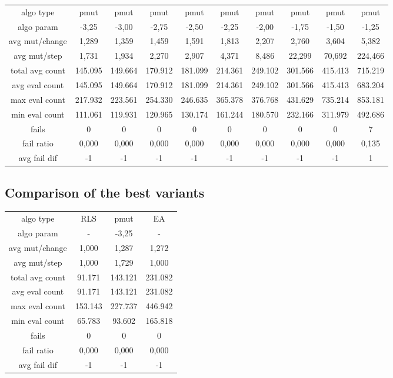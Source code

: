\begin{tabular}[h]{cccccccccc}
algo type&           pmut&    pmut&    pmut&    pmut&    pmut&    pmut&    pmut&    pmut&    pmut\\
algo param&         -3,25&   -3,00&   -2,75&   -2,50&   -2,25&   -2,00&   -1,75&   -1,50&   -1,25\\
avg mut/change&     1,289&   1,359&   1,459&   1,591&   1,813&   2,207&   2,760&   3,604&   5,382\\
avg mut/step&       1,731&   1,934&   2,270&   2,907&   4,371&   8,486&  22,299&  70,692& 224,466\\
\hline
total avg count&  145.095& 149.664& 170.912& 181.099& 214.361& 249.102& 301.566& 415.413& 715.219\\
avg eval count&   145.095& 149.664& 170.912& 181.099& 214.361& 249.102& 301.566& 415.413& 683.204\\
max eval count&   217.932& 223.561& 254.330& 246.635& 365.378& 376.768& 431.629& 735.214& 853.181\\
min eval count&   111.061& 119.931& 120.965& 130.174& 161.244& 180.570& 232.166& 311.979& 492.686\\
\hline
fails&                  0&       0&       0&       0&       0&       0&       0&       0&       7\\
fail ratio&         0,000&   0,000&   0,000&   0,000&   0,000&   0,000&   0,000&   0,000&   0,135\\
avg fail dif&          -1&      -1&      -1&      -1&      -1&      -1&      -1&      -1&       1\\
\end{tabular}


\subsection{Comparison of the best variants}


\begin{tabular}[h]{cccc}
algo type&            RLS&    pmut&      EA\\
algo param&             -&   -3,25&       -\\
avg mut/change&     1,000&   1,287&   1,272\\
avg mut/step&       1,000&   1,729&   1,000\\
\hline
total avg count&   91.171& 143.121& 231.082\\
avg eval count&    91.171& 143.121& 231.082\\
max eval count&   153.143& 227.737& 446.942\\
min eval count&    65.783&  93.602& 165.818\\
\hline
fails&                  0&       0&       0\\
fail ratio&         0,000&   0,000&   0,000\\
avg fail dif&          -1&      -1&      -1\\
\end{tabular}

